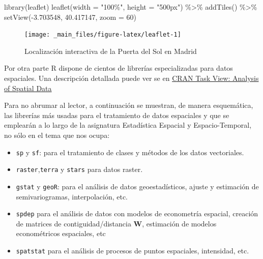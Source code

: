 \documentclass[
]{report}
\newenvironment{Shaded}{\begin{snugshade}}{\end{snugshade}}
\newcommand{\AttributeTok}[1]{\textcolor[rgb]{0.77,0.63,0.00}{#1}}
\newcommand{\DecValTok}[1]{\textcolor[rgb]{0.00,0.00,0.81}{#1}}
\newcommand{\FloatTok}[1]{\textcolor[rgb]{0.00,0.00,0.81}{#1}}
\newcommand{\FunctionTok}[1]{\textcolor[rgb]{0.00,0.00,0.00}{#1}}
\newcommand{\NormalTok}[1]{#1}
\newcommand{\SpecialCharTok}[1]{\textcolor[rgb]{0.00,0.00,0.00}{#1}}
\newcommand{\StringTok}[1]{\textcolor[rgb]{0.31,0.60,0.02}{#1}}
\begin{document}
\begin{Shaded}
\begin{Highlighting}[]
\FunctionTok{library}\NormalTok{(leaflet)}
\FunctionTok{leaflet}\NormalTok{(}\AttributeTok{width =} \StringTok{"100\%"}\NormalTok{, }\AttributeTok{height =} \StringTok{"500px"}\NormalTok{) }\SpecialCharTok{\%\textgreater{}\%}
  \FunctionTok{addTiles}\NormalTok{() }\SpecialCharTok{\%\textgreater{}\%}
  \FunctionTok{setView}\NormalTok{(}\SpecialCharTok{{-}}\FloatTok{3.703548}\NormalTok{, }\FloatTok{40.417147}\NormalTok{, }\AttributeTok{zoom =} \DecValTok{60}\NormalTok{)}
\end{Highlighting}
\end{Shaded}

\begin{figure}

{\centering \texttt{[image: \_main\_files/figure-latex/leaflet-1]} 

}

\caption{Localización interactiva de la Puerta del Sol en Madrid}\label{fig:leaflet}
\end{figure}

Por otra parte R dispone de cientos de librerías especializadas para datos
espaciales. Una descripción detallada puede ver se en \href{https://cran.r-project.org/web/views/Spatial.html}{CRAN Task View: Analysis
of Spatial Data}

Para no abrumar al lector, a continuación se muestran, de manera esquemática,
las librerías más usadas para el tratamiento de datos espaciales y que se
emplearán a lo largo de la asignatura Estadística Espacial y Espacio-Temporal,
no sólo en el tema que nos ocupa:

\begin{itemize}
\item
  \texttt{sp} y \texttt{sf}: para el tratamiento de clases y métodos de los datos
  vectoriales.
\item
  \texttt{raster},\texttt{terra} y \texttt{stars} para datos raster.
\item
  \texttt{gstat} y \texttt{geoR}: para el análisis de datos geoestadísticos, ajuste y
  estimación de semivariogramas, interpolación, etc.
\item
  \texttt{spdep} para el análisis de datos con modelos de econometría espacial,
  creación de matrices de contiguidad/distancia \textbf{W}, estimación de modelos
  econométricos espaciales, etc
\item
  \texttt{spatstat} para el análisis de procesos de puntos espaciales, intensidad,
  etc.
\end{itemize}
\end{document}

